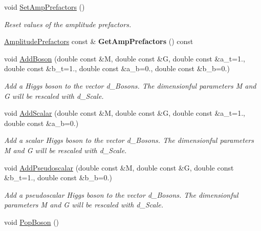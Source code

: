 \begin{DoxyCompactItemize}
\item 
\hypertarget{classHiggsModel_a514e3dd7854409c622b8e200fe2ee84c}{void \hyperlink{classHiggsModel_a514e3dd7854409c622b8e200fe2ee84c}{Set\-Amp\-Prefactors} ()}\label{classHiggsModel_a514e3dd7854409c622b8e200fe2ee84c}

\begin{DoxyCompactList}\small\item\em Reset values of the amplitude prefactors. \end{DoxyCompactList}\item 
\hypertarget{classHiggsModel_a77b35a425c80b8d9006354670f91acca}{\hyperlink{structAmplitudePrefactors}{Amplitude\-Prefactors} const \& {\bfseries Get\-Amp\-Prefactors} () const }\label{classHiggsModel_a77b35a425c80b8d9006354670f91acca}

\item 
void \hyperlink{classHiggsModel_acd87bf9a85c37da737aba62a0dc82b5b}{Add\-Boson} (double const \&M, double const \&G, double const \&a\-\_\-t=1., double const \&b\-\_\-t=1., double const \&a\-\_\-b=0., double const \&b\-\_\-b=0.)
\begin{DoxyCompactList}\small\item\em Add a Higgs boson to the vector d\-\_\-\-Bosons. The dimensionful parameters M and G will be rescaled with d\-\_\-\-Scale. \end{DoxyCompactList}\item 
void \hyperlink{classHiggsModel_ab84c9016bf5a8bd87f82f214c34cce8b}{Add\-Scalar} (double const \&M, double const \&G, double const \&a\-\_\-t=1., double const \&a\-\_\-b=0.)
\begin{DoxyCompactList}\small\item\em Add a scalar Higgs boson to the vector d\-\_\-\-Bosons. The dimensionful parameters M and G will be rescaled with d\-\_\-\-Scale. \end{DoxyCompactList}\item 
void \hyperlink{classHiggsModel_a94f5b60024363838e73e0e1b8d1604ca}{Add\-Pseudoscalar} (double const \&M, double const \&G, double const \&b\-\_\-t=1., double const \&b\-\_\-b=0.)
\begin{DoxyCompactList}\small\item\em Add a pseudoscalar Higgs boson to the vector d\-\_\-\-Bosons. The dimensionful parameters M and G will be rescaled with d\-\_\-\-Scale. \end{DoxyCompactList}\item 
\hypertarget{classHiggsModel_a7aea18c2e6622159e8f6cc29be537c0f}{void \hyperlink{classHiggsModel_a7aea18c2e6622159e8f6cc29be537c0f}{Pop\-Boson} ()}\label{classHiggsModel_a7aea18c2e6622159e8f6cc29be537c0f}


\end{DoxyCompactItemize}
